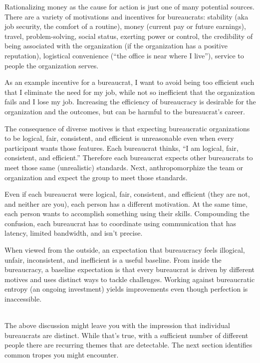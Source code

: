 Rationalizing money as the cause for action is just one of many potential sources.
There are a variety of motivations and incentives for bureaucrats: 
stability (aka job security, the comfort of a routine),
money (current pay or future earnings), 
travel, 
problem-solving, 
social status, 
exerting power or control, 
the credibility of being associated with the organization (if the organization has a positive reputation), 
logistical convenience (``the office is near where I live''), 
service to people the organization serves.


As an example incentive for a bureaucrat, I want to avoid being too efficient such that I eliminate the need for my job, 
%
while not so inefficient that the organization fails and I lose my job. Increasing the efficiency of bureaucracy is desirable for the organization and the outcomes, but can be harmful to the bureaucrat's career.


The consequence of diverse motives is that expecting bureaucratic organizations to be logical, fair, consistent, and efficient is unreasonable even when every participant wants those features. Each bureaucrat thinks, ``I am logical, fair, consistent, and efficient.'' Therefore each bureaucrat expects other bureaucrats to meet those same (unrealistic) standards. Next, anthropomorphize the team or organization and expect the group to meet those standards. 

Even if each bureaucrat were logical, fair, consistent, and efficient (they are not, and neither are you), each person has a different motivation. %
At the same time, each person wants to accomplish something using their skills. %
 Compounding the confusion, each bureaucrat has to coordinate using communication that has latency, limited bandwidth, and isn't precise.

When viewed from the outside, an expectation that bureaucracy feels illogical, unfair, inconsistent, and inefficient is a useful baseline. From inside the bureaucracy, a baseline expectation is that every bureaucrat is driven by different motives and uses distinct ways to tackle challenges. Working against bureaucratic entropy (an ongoing investment) yields improvements even though perfection is inaccessible.


\ \\


The above discussion might leave you with the impression that individual bureaucrats are distinct. While that's true, with a sufficient number of different people there are recurring themes that are detectable. The next section identifies common tropes you might encounter.